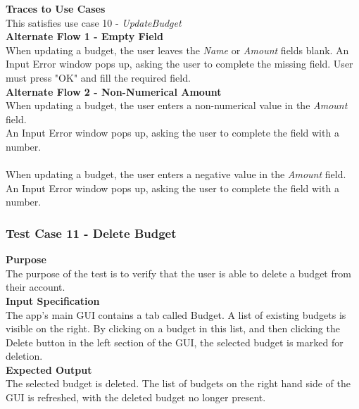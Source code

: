 \documentclass[12pt]{article}
\begin{document}
\noindent
{\bf Traces to Use Cases}\\
This satisfies use case 10 - \textit{UpdateBudget}\\

\noindent
{\bf Alternate Flow 1 - Empty Field}\\
When updating a budget, the user leaves the \textit{Name} or \textit{Amount} fields blank.
An Input Error window pops up, asking the user to complete the missing field. User must press "OK" and fill the required field.\\

\noindent
{\bf Alternate Flow 2 - Non-Numerical Amount}\\
When updating a budget, the user enters a non-numerical value in the \textit{Amount} field. \\
An Input Error window pops up, asking the user to complete the field with a number. \\

\\
When updating a budget, the user enters a negative value in the \textit{Amount} field. \\
An Input Error window pops up, asking the user to complete the field with a number. \\

\clearpage

\subsubsection{Test Case 11 - Delete Budget} \label{TC-11}
\noindent
{\bf Purpose}\\
The purpose of the test is to verify that the user is able to delete a budget from their account. \\          
                         
\noindent
{\bf Input Specification}\\
The app's main GUI contains a tab called Budget. A list of existing budgets is visible on the right. By clicking on a budget in this list, and then clicking the Delete button in the left section of the GUI, the selected budget is marked for deletion.\\

\noindent
{\bf Expected Output}\\
The selected budget is deleted. The list of budgets on the right hand side of the GUI is refreshed, with the deleted budget no longer present.\\
\end{document}
